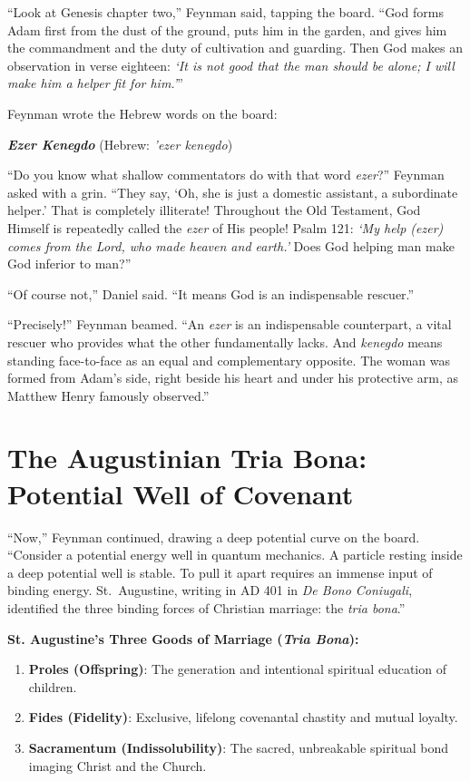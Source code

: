 \documentclass[11pt]{report}
\begin{document}
``Look at Genesis chapter two,'' Feynman said, tapping the board. ``God forms Adam first from the dust of the ground, puts him in the garden, and gives him the commandment and the duty of cultivation and guarding. Then God makes an observation in verse eighteen: \textit{`It is not good that the man should be alone; I will make him a helper fit for him.'}''

Feynman wrote the Hebrew words on the board:
\begin{blackboard}
\centering
\Large \textbf{\textit{Ezer Kenegdo}} (Hebrew: \textit{'ezer kenegdo})
\end{blackboard}

``Do you know what shallow commentators do with that word \textit{ezer}?'' Feynman asked with a grin. ``They say, `Oh, she is just a domestic assistant, a subordinate helper.' That is completely illiterate! Throughout the Old Testament, God Himself is repeatedly called the \textit{ezer} of His people! Psalm 121: \textit{`My help (ezer) comes from the Lord, who made heaven and earth.'} Does God helping man make God inferior to man?''

``Of course not,'' Daniel said. ``It means God is an indispensable rescuer.''

``Precisely!'' Feynman beamed. ``An \textit{ezer} is an indispensable counterpart, a vital rescuer who provides what the other fundamentally lacks. And \textit{kenegdo} means standing face-to-face as an equal and complementary opposite. The woman was formed from Adam's side, right beside his heart and under his protective arm, as Matthew Henry famously observed.''

\section{The Augustinian Tria Bona: Potential Well of Covenant}
``Now,'' Feynman continued, drawing a deep potential curve on the board. ``Consider a potential energy well in quantum mechanics. A particle resting inside a deep potential well is stable. To pull it apart requires an immense input of binding energy. St.~Augustine, writing in AD 401 in \textit{De Bono Coniugali}, identified the three binding forces of Christian marriage: the \textit{tria bona}.''

\begin{blackboard}
\textbf{St. Augustine's Three Goods of Marriage (\textit{Tria Bona}):}
\begin{enumerate}
    \item \textbf{Proles (Offspring)}: The generation and intentional spiritual education of children.
    \item \textbf{Fides (Fidelity)}: Exclusive, lifelong covenantal chastity and mutual loyalty.
    \item \textbf{Sacramentum (Indissolubility)}: The sacred, unbreakable spiritual bond imaging Christ and the Church.
\end{enumerate}
\end{blackboard}
\end{document}
